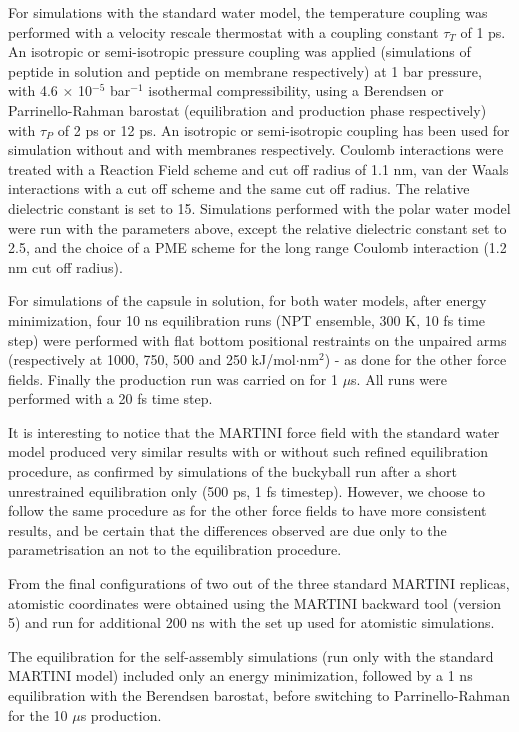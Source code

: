 For simulations with the standard water model, the temperature coupling was performed with a velocity rescale thermostat \citep{Bussi2007} with a coupling constant $\tau _T$ of 1 ps. An isotropic or semi-isotropic pressure coupling was applied (simulations of peptide in solution and peptide on membrane respectively) at 1 bar pressure, with 4.6 $\times$ 10$^{-5}$ bar$^{-1}$ isothermal compressibility, using a Berendsen \citep{Berendsen1984} or Parrinello-Rahman barostat \citep{Parrinello1981} (equilibration and production phase respectively) with $\tau _P$ of 2 ps or 12 ps. An isotropic or semi-isotropic coupling has been used for simulation without and with membranes respectively.
%
Coulomb interactions were treated with a Reaction Field scheme \citep{Tironi1995} and cut off radius of 1.1 nm, van der Waals interactions with a cut off scheme and the same cut off radius. The relative dielectric constant is set to 15.
%
Simulations performed with the polar water model were run with the parameters above, except the relative dielectric constant set to 2.5, and the choice of a PME scheme for the long range Coulomb interaction (1.2 nm cut off radius).

For simulations of the capsule in solution, for both water models, after energy minimization, four 10 ns equilibration runs (NPT ensemble, 300 K, 10 fs time step) were performed with flat bottom positional restraints on the unpaired arms (respectively at 1000, 750, 500 and 250 kJ/mol$\cdot$nm$^2$) - as done for the other force fields.
%
Finally the production run was carried on for 1 $\mu$s. All runs were performed with a 20 fs time step.

It is interesting to notice that the MARTINI force field with the standard water model produced very similar results with or without such refined equilibration procedure, as confirmed by simulations of the buckyball run after a short unrestrained equilibration only (500 ps, 1 fs timestep). However, we choose to follow the same procedure as for the other force fields to have more consistent results, and be certain that the differences observed are due only to the parametrisation an not to the equilibration procedure.

From the final configurations of two out of the three standard MARTINI replicas, atomistic coordinates were obtained using the MARTINI backward tool (version 5) \citep{Wassenaar2014} and run for additional 200 ns with the set up used for atomistic simulations.

The equilibration for the self-assembly simulations (run only with the standard MARTINI model) included only an energy minimization, followed by a 1 ns equilibration with the Berendsen barostat, before switching to Parrinello-Rahman for the 10 $\mu$s production.

